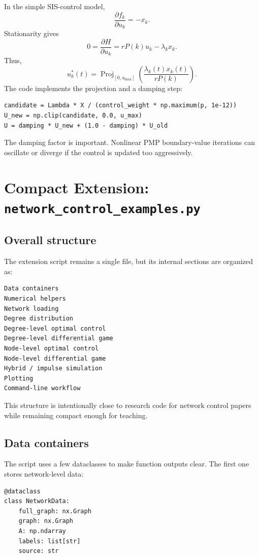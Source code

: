 \documentclass[11pt,a4paper]{article}
\newcommand{\Proj}{\operatorname{Proj}}
\begin{document}
In the simple SIS-control model,
\[
  \frac{\partial f_k}{\partial u_k}=-x_k.
\]
Stationarity gives
\[
  0=\frac{\partial H}{\partial u_k}
   = rP(k)u_k-\lambda_kx_k.
\]
Thus,
\[
  u_k^*(t)
  =\Proj_{[0,u_{\max}]}
  \left(
    \frac{\lambda_k(t)x_k(t)}{rP(k)}
  \right).
\]
The code implements the projection and a damping step:

\begin{lstlisting}[style=py]
candidate = Lambda * X / (control_weight * np.maximum(p, 1e-12))
U_new = np.clip(candidate, 0.0, u_max)
U = damping * U_new + (1.0 - damping) * U_old
\end{lstlisting}

The damping factor is important. Nonlinear PMP boundary-value iterations can oscillate or diverge if the control is updated too aggressively.

\section[Compact Extension: network\_control\_examples.py]{Compact Extension: \texttt{network\_control\_examples.py}}

\subsection{Overall structure}

The extension script remains a single file, but its internal sections are organized as:

\begin{lstlisting}[style=text]
Data containers
Numerical helpers
Network loading
Degree distribution
Degree-level optimal control
Degree-level differential game
Node-level optimal control
Node-level differential game
Hybrid / impulse simulation
Plotting
Command-line workflow
\end{lstlisting}

This structure is intentionally close to research code for network control papers while remaining compact enough for teaching.

\subsection{Data containers}

The script uses a few dataclasses to make function outputs clear. The first one stores network-level data:

\begin{lstlisting}[style=py]
@dataclass
class NetworkData:
    full_graph: nx.Graph
    graph: nx.Graph
    A: np.ndarray
    labels: list[str]
    source: str
\end{lstlisting}
\end{document}
